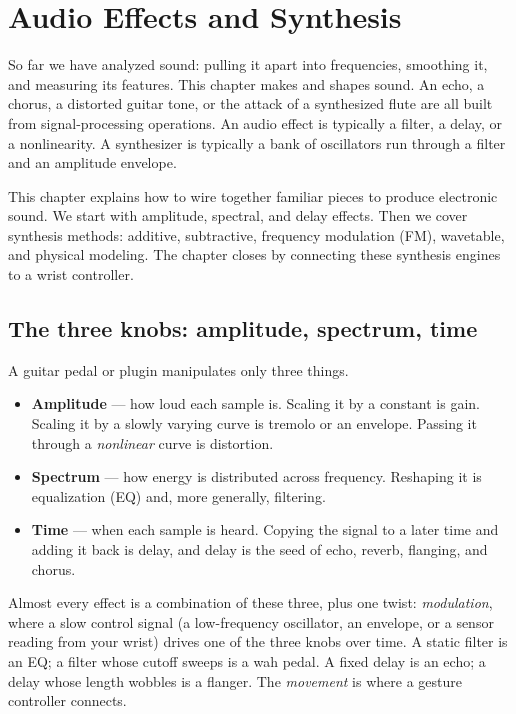 \chapter{Audio Effects and Synthesis}

So far we have analyzed sound: pulling it apart into frequencies, smoothing it, and measuring its features. This chapter makes and shapes sound. An echo, a chorus, a distorted guitar tone, or the attack of a synthesized flute are all built from signal-processing operations. An audio effect is typically a filter, a delay, or a nonlinearity. A synthesizer is typically a bank of oscillators run through a filter and an amplitude envelope.

This chapter explains how to wire together familiar pieces to produce electronic sound. We start with amplitude, spectral, and delay effects. Then we cover synthesis methods: additive, subtractive, frequency modulation (FM), wavetable, and physical modeling. The chapter closes by connecting these synthesis engines to a wrist controller.

\chapterline

\section{The three knobs: amplitude, spectrum, time}
\label{ch28:three-knobs}

A guitar pedal or plugin manipulates only
three things.

\begin{itemize}
  \item \textbf{Amplitude} --- how loud each sample is. Scaling it by a constant
        is gain. Scaling it by a slowly varying curve is tremolo or an envelope.
        Passing it through a \emph{nonlinear} curve is distortion.
  \item \textbf{Spectrum} --- how energy is distributed across frequency.
        Reshaping it is equalization (EQ) and, more generally, filtering.
  \item \textbf{Time} --- when each sample is heard. Copying the signal to a
        later time and adding it back is delay, and delay is the seed of echo,
        reverb, flanging, and chorus.
\end{itemize}

\begin{intuitionbox}
Almost every effect is a combination of these three, plus one twist:
\emph{modulation}, where a slow control signal (a low-frequency oscillator, an
envelope, or a sensor reading from your wrist) drives one of the three knobs over
time. A static filter is an EQ; a filter whose cutoff sweeps is a wah pedal. A
fixed delay is an echo; a delay whose length wobbles is a flanger. The \emph{movement} is where a gesture controller connects.
\end{intuitionbox}

